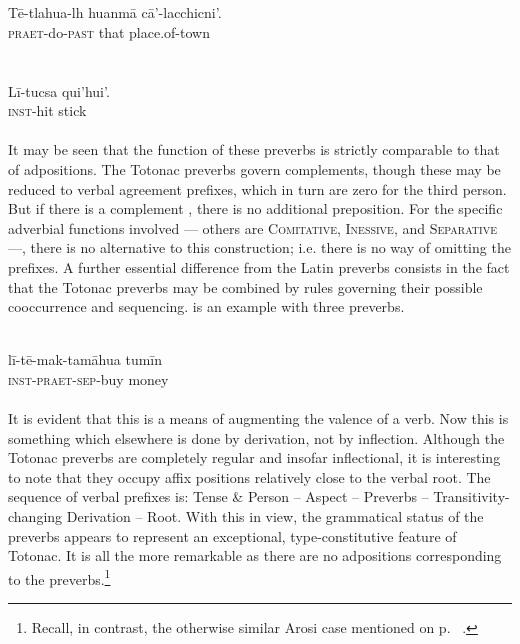 \ea\label{ex:E81}
\langinfo{\LangToton}{}{}\\
 \ea {}\\
 \gll T\=e-tlahua-lh  huanm\=a  c\=a'-lacchicni'.\\
   \textsc{praet}-do-\textsc{past}  that  place.of-town\\
\\
\ex {}\\
\gll  L\=i-tucsa  qui'hui'.\\
 \textsc{inst}-hit  stick\\
\\
\z
\z
\noindent 
It may be seen that the function of these preverbs is strictly comparable to that of adpositions. The Totonac preverbs govern complements, though these may be reduced to verbal agreement prefixes, which in turn are zero for the third person. But if there is a complement \np, there is no additional preposition. For the specific adverbial functions involved — others are \textsc{Comitative}, \textsc{Inessive}, and \textsc{Separative} —, there is no alternative to this construction; i.e. there is no way of omitting the prefixes.
\newpage
A further essential difference from the Latin preverbs consists in the fact that the Totonac preverbs may be combined by rules governing their possible cooccurrence and sequencing.  is an example with three preverbs.

\ea\label{ex:E82}
 \\
\gll l\=i-t\=e-mak-tam\=ahua  tum\=in\\
\textsc{inst}-\textsc{praet}-\textsc{sep}-buy  money\\
\\
\z
\noindent It is evident that this is a means of augmenting the valence of a verb. Now this is something which elsewhere is done by derivation, not by inflection. Although the Totonac preverbs are completely regular and insofar inflectional, it is interesting to note that they occupy affix positions relatively close to the verbal root. The sequence of verbal prefixes is: Tense \& Person -- Aspect -- Preverbs -- Transitivity-changing Derivation -- Root. With this in view, the grammatical status of the preverbs appears to represent an exceptional, type-constitutive feature of Totonac. It is all the more remarkable as there are no adpositions corresponding to the preverbs.\footnote{Recall, in contrast, the otherwise similar Arosi case mentioned on p.~\pageref{page105}\chkfn%
.}

